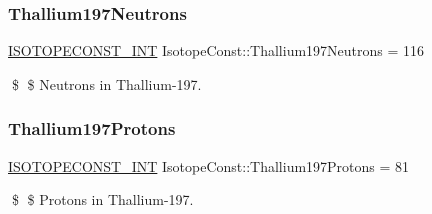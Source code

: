 \subsubsection{\texorpdfstring{Thallium197\+Neutrons}{Thallium197Neutrons}}
{\footnotesize\ttfamily \mbox{\hyperlink{group___isotope_const-_macros_ga5f18360b3e99483a35c32d789e62621c}{I\+S\+O\+T\+O\+P\+E\+C\+O\+N\+S\+T\+\_\+\+I\+NT}} Isotope\+Const\+::\+Thallium197\+Neutrons = 116}

\$ \$ Neutrons in Thallium-\/197. \mbox{\label{group___isotope_const-_thallium-_tl197_gacc697cdf6e3c2a5d7f49e83fddb185a8}} 
\subsubsection{\texorpdfstring{Thallium197\+Protons}{Thallium197Protons}}
{\footnotesize\ttfamily \mbox{\hyperlink{group___isotope_const-_macros_ga5f18360b3e99483a35c32d789e62621c}{I\+S\+O\+T\+O\+P\+E\+C\+O\+N\+S\+T\+\_\+\+I\+NT}} Isotope\+Const\+::\+Thallium197\+Protons = 81}

\$ \$ Protons in Thallium-\/197. 
